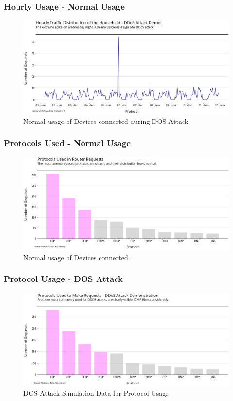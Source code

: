 \documentclass[11pt]{article}
\begin{document}
\subsubsection{Hourly Usage - Normal Usage}
\begin{figure}[H]
    \centering
    \includegraphics[width=.95\textwidth]{router_log_analysis_graphs/ddos_hourly_usage.png}
    \caption{Normal usage of Devices connected during DOS Attack }
\end{figure}

\subsubsection{Protocols Used - Normal Usage}
\begin{figure}[H]
    \centering
    \includegraphics[width=.95\textwidth]{router_log_analysis_graphs/normal_protocols.png}
    \caption{Normal usage of Devices connected. }
\end{figure}


\subsubsection{Protocol Usage - DOS Attack}
\begin{figure}[H]
    \centering
    \includegraphics[width=.95\textwidth]{router_log_analysis_graphs/ddos_protocols.png}
    \caption{DOS Attack Simulation Data for Protocol Usage}
\end{figure}
\end{document}
